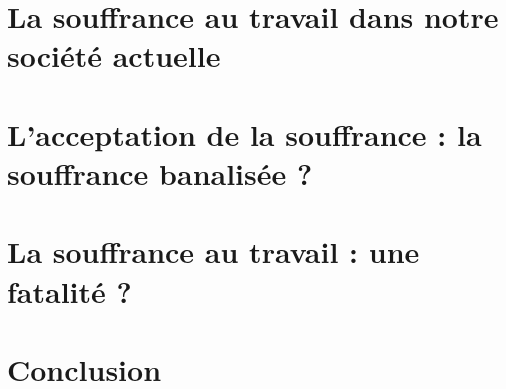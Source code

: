 \documentclass{report}
\begin{document}
\chapter{La souffrance au travail dans notre société actuelle}

\chapter{L’acceptation de la souffrance : la souffrance banalisée ?}

\chapter{La souffrance au travail : une fatalité ?}
    
\chapter*{Conclusion}
    \paragraph*{}
         
\end{document}
